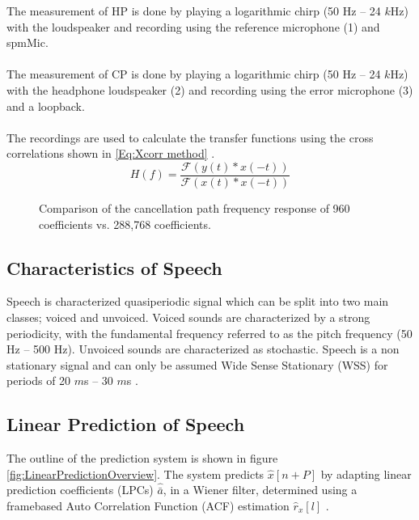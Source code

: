 The measurement of HP is done by playing a logarithmic chirp (50 Hz -- 24 $k$Hz) with the loudspeaker and recording using the reference microphone (1) and spmMic.  
\\\\
The measurement of CP is done by playing a logarithmic chirp (50 Hz -- 24 $k$Hz) with the headphone loudspeaker (2) and recording using the error microphone (3) and a loopback.
\\\\
The recordings are used to calculate the transfer functions using the cross correlations shown in \autoref{Eq:Xcorr method} \cite{TutorialMeasurementPowerSpectra}.   
\begin{equation}
H(f)=\dfrac{\mathscr{F}(y(t)\ast x(-t))} {\mathscr{F}(x(t)\ast x(-t))}
\label{Eq:Xcorr method}
\end{equation}

\begin{figure}[H]
	\centering
	
	\caption{Comparison of the cancellation path frequency response of 960 coefficients vs. 288,768 coefficients.}
	\label{CancellationPathImpulseResponseCompare}
\end{figure}

\subsection{Characteristics of Speech}
Speech is characterized quasiperiodic signal which can be split into two main classes; voiced and unvoiced. Voiced sounds are characterized by a strong periodicity, with the fundamental frequency referred to as the pitch frequency (50 Hz -- 500 Hz). Unvoiced sounds are characterized as stochastic. Speech is a non stationary signal and can only be assumed Wide Sense Stationary (WSS) for periods of 20 $m$s -- 30 $m$s \cite{Speech}. 

\subsection{Linear Prediction of Speech}
The outline of the prediction system is shown in figure \ref{fig:LinearPredictionOverview}. The system predicts $\hat{x}[n+P]$ by adapting linear prediction coefficients (LPCs) $\hat{\bar{a}}$, in a Wiener filter, determined using a framebased Auto Correlation Function (ACF) estimation $\hat{r}_x[l]$ \cite{LinearPrediction}.   

